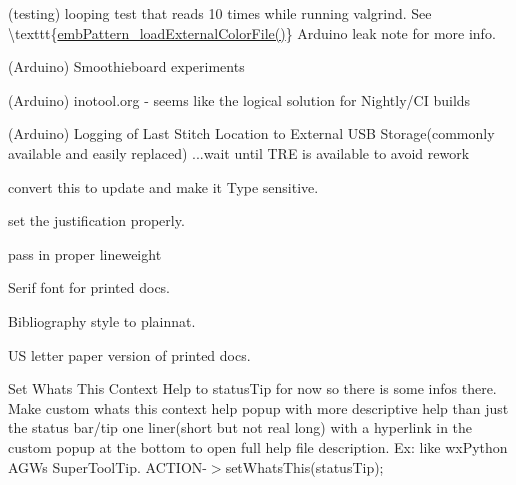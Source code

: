 \begin{DoxyRefList}
\label{todo__todo000197}%
%
(testing) looping test that reads 10 times while running valgrind. See \textbackslash{}texttt\{\mbox{\hyperlink{embroidery_8h_a3bf191bd99e2da8d36465f454a4646f6}{emb\+Pattern\+\_\+load\+External\+Color\+File()}}\} Arduino leak note for more info.

\label{todo__todo000196}%
%
(Arduino) Smoothieboard experiments

\label{todo__todo000195}%
%
(Arduino) inotool.\+org -\/ seems like the logical solution for Nightly/\+CI builds

\label{todo__todo000194}%
%
(Arduino) Logging of Last Stitch Location to External USB Storage(commonly available and easily replaced) ...wait until TRE is available to avoid rework 
\item[Member \mbox{\hyperlink{classGeometry_a1545e793f7715b0886a884790622f847}{Geometry\+::calculate\+Arc\+Data}} (Emb\+Arc arc)]\label{todo__todo000013}%
%
convert this to update and make it Type sensitive.  
\item[Member \mbox{\hyperlink{classGeometry_a3a2630a232e7ee84a0ac8fa76ba70523}{Geometry\+::init\+\_\+text\+\_\+single}} (QString str, Emb\+Vector position, QRgb rgb, Qt\+::\+Pen\+Style line\+Type)]\label{todo__todo000012}%
%
set the justification properly. 



pass in proper lineweight  
\item[Page \mbox{\hyperlink{Ideas}{Ideas}} ]\label{todo__todo000188}%
%
Serif font for printed docs.

\label{todo__todo000187}%
%
Bibliography style to plainnat.

\label{todo__todo000189}%
%
US letter paper version of printed docs. 
\item[Member \mbox{\hyperlink{classMainWindow_a5de9bc12f363ba45fb8082f262d24deb}{Main\+Window\+::create\+All\+Actions}} ()]\label{todo__todo000008}%
%
Set What\textquotesingle{}s This Context Help to status\+Tip for now so there is some infos there. Make custom whats this context help popup with more descriptive help than just the status bar/tip one liner(short but not real long) with a hyperlink in the custom popup at the bottom to open full help file description. Ex\+: like wx\+Python AGW\textquotesingle{}s Super\+Tool\+Tip. ACTION-\/\texorpdfstring{$>$}{>}set\+Whats\+This(status\+Tip); 




\end{DoxyRefList}
